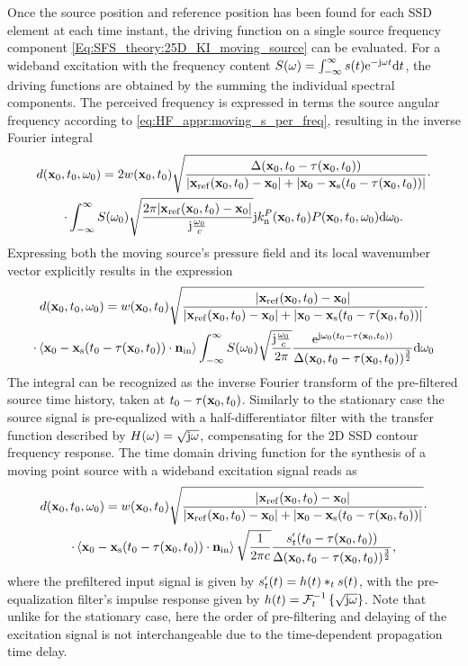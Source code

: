 Once the source position and reference position has been found for each SSD element at each time instant, the driving function on a single source frequency component \eqref{Eq:SFS_theory:25D_KI_moving_source} can be evaluated.
For a wideband excitation with the frequency content $S(\omega) = \int_{-\infty}^{\infty} s(t) \mathrm{e}^{-\mathrm{j} \omega t} \mathrm{d} t$, the driving functions are obtained by the summing the individual spectral components.
The perceived frequency is expressed in terms the source angular frequency according to \eqref{eq:HF_appr:moving_s_per_freq}, resulting in the inverse Fourier integral
\begin{multline}
\small
d(\mathbf{x}_0,t_0,\omega_0) =2 w(\mathbf{x}_0,t_0) 
\sqrt{\frac{\Delta(\mathbf{x}_0,t_0-\tau(\mathbf{x}_0,t_0))}{|\mathbf{x}_{\mathrm{ref}}(\mathbf{x}_0,t_0)-\mathbf{x}_0|+|\mathbf{x}_0 - \mathbf{x}_{\mathrm{s}}(t_0-\tau(\mathbf{x}_0,t_0))|}}
\cdot \\ \cdot
 \int_{-\infty}^{\infty} S(\omega_0)
\sqrt{\frac{2\pi |\mathbf{x}_{\mathrm{ref}}(\mathbf{x}_0,t_0)-\mathbf{x}_0|}{\mathrm{j} \frac{\omega_0}{c} }}
\mathrm{j} k_{\mathrm{n}}^P(\mathbf{x}_0,t_0) P(\mathbf{x}_0,t_0,\omega_0) \mathrm{d} \omega_0.
\end{multline}
Expressing both the moving source's pressure field and its local wavenumber vector explicitly results in the expression
\begin{multline}
\small
d(\mathbf{x}_0,t_0,\omega_0) = w(\mathbf{x}_0,t_0) 
\sqrt{\frac{|\mathbf{x}_{\mathrm{ref}}(\mathbf{x}_0,t_0)-\mathbf{x}_0| }{|\mathbf{x}_{\mathrm{ref}}(\mathbf{x}_0,t_0)-\mathbf{x}_0|+|\mathbf{x}_0 - \mathbf{x}_{\mathrm{s}}(t_0-\tau(\mathbf{x}_0,t_0))|}}
\cdot \\ \cdot
\left< \mathbf{x}_0 -\mathbf{x}_{\mathrm{s}}(t_0-\tau(\mathbf{x}_0,t_0)) \cdot \mathbf{n}_{\mathrm{in}} \right>
\int_{-\infty}^{\infty} S(\omega_0)
\sqrt{\frac{\mathrm{j} \frac{\omega_0}{c}}{2\pi}}
\frac{\mathrm{e}^{\mathrm{j} \omega_0\left( t_0 - \tau( \mathbf{x}_0,t_0 )\right)}}{\Delta(\mathbf{x}_0,t_0-\tau( \mathbf{x}_0, t_0 ))^{\frac{3}{2}}}
 \mathrm{d} \omega_0
\end{multline}
The integral can be recognized as the inverse Fourier transform of the pre-filtered source time history, taken at $t_0 - \tau( \mathbf{x}_0,t_0 )$.
Similarly to the stationary case the source signal is pre-equalized with a half-differentiator filter with the transfer function described by $H(\omega) = \sqrt{\mathrm{j} \omega}$, compensating for the 2D SSD contour frequency response.
The time domain driving function for the synthesis of a moving point source with a wideband excitation signal reads as
\begin{multline}
\small
d(\mathbf{x}_0,t_0,\omega_0) = w(\mathbf{x}_0,t_0) 
\sqrt{\frac{|\mathbf{x}_{\mathrm{ref}}(\mathbf{x}_0,t_0)-\mathbf{x}_0| }{|\mathbf{x}_{\mathrm{ref}}(\mathbf{x}_0,t_0)-\mathbf{x}_0|+|\mathbf{x}_0 - \mathbf{x}_{\mathrm{s}}(t_0-\tau(\mathbf{x}_0,t_0))|}}
\cdot \\ \cdot
\left< \mathbf{x}_0 -\mathbf{x}_{\mathrm{s}}(t_0-\tau(\mathbf{x}_0,t_0)) \cdot \mathbf{n}_{\mathrm{in}} \right>
\sqrt{\frac{1}{2\pi c}}
\frac{ s^{\nshortmid}_t(t_0 - \tau( \mathbf{x}_0,t_0 )) }{\Delta(\mathbf{x}_0,t_0-\tau( \mathbf{x}_0, t_0 ))^{\frac{3}{2}}},
\label{Eq:Moving_source:25D_WFS}
\end{multline}
where the prefiltered input signal is given by $ s^{\nshortmid}_t(t) = h(t) \ast_{t} s(t)$, with the pre-equalization filter's impulse response given by $h(t) = \mathcal{F}^{-1}_t\left\{ \sqrt{\mathrm{j} \omega} \right\}$.
Note that unlike for the stationary case, here the order of pre-filtering and delaying of the excitation signal is not interchangeable due to the time-dependent propagation time delay.

